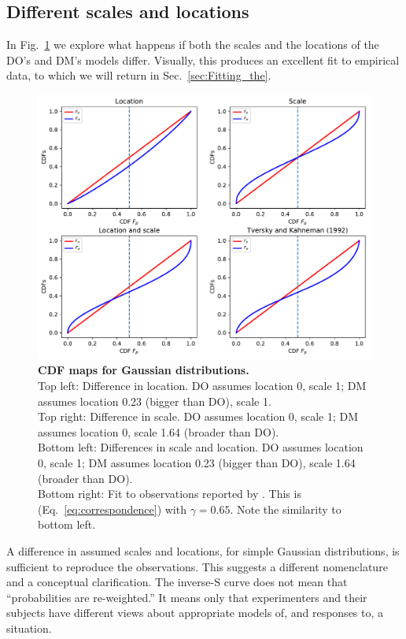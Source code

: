 \documentclass[a4paper, 12pt]{article}
\newcommand{\eref}[1]{(Eq.~\ref{eq:#1})}
\newcommand{\flabel}[1]{\label{fig:#1}}
\newcommand{\fref}[1]{Fig.~\ref{fig:#1}}
\newcommand{\seclabel}[1]{\label{sec:#1}}
\newcommand{\secref}[1]{Sec.~\ref{sec:#1}}
\begin{document}
\subsection{Different scales and locations\seclabel{A_mismatch}}
In \fref{Gauss_scale_location_both_KT} we explore what happens if both the scales and the locations of the DO's and DM's models differ. Visually, this produces an excellent fit to empirical data, to which we will return in \secref{Fitting_the}.
\begin{figure}
\centering
\includegraphics[width=1.0\textwidth]{./figs/Gauss_scale_location_both_KT.pdf}
\caption{\textbf{CDF maps for Gaussian distributions.}\\
Top left: Difference in location. DO assumes location 0, scale 1; DM assumes location 0.23 (bigger than DO), scale 1.\\
Top right: Difference in scale. DO assumes location 0, scale 1; DM assumes location 0, scale 1.64 (broader than DO).\\
Bottom left: Differences in scale and location. DO assumes location 0, scale 1; DM assumes location 0.23 (bigger than DO), scale 1.64 (broader than DO).\\
Bottom right: Fit to observations reported by \textcite{TverskyKahneman1992}. This is \eref{correspondence} with $\gamma=0.65$.
Note the similarity to bottom left.}
\flabel{Gauss_scale_location_both_KT}
\end{figure}
A difference in assumed scales and locations, for simple Gaussian distributions, is sufficient to reproduce the observations. This suggests a different nomenclature and a conceptual clarification. The inverse-S curve does not mean that ``probabilities are re-weighted.'' It means only that experimenters and their subjects have different views about appropriate models of, and responses to, a situation.
\end{document}

